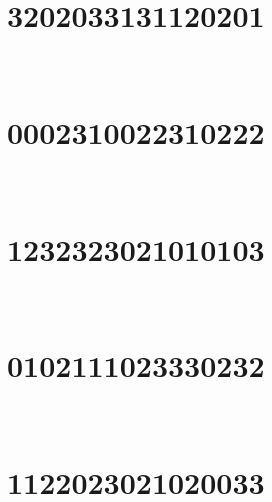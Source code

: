 \section{3202033131120201}

\marginnote[3\baselineskip]{\centering}



\,
\newline
\vspace{1.2cm}

\section{0002310022310222}

\marginnote[3\baselineskip]{\centering}



\,
\newline
\vspace{1.2cm}

\section{1232323021010103}

\marginnote[3\baselineskip]{\centering}



\,
\newline
\vspace{1.2cm}

\section{0102111023330232}

\marginnote[3\baselineskip]{\centering}



\,
\newline
\vspace{1.2cm}

\section{1122023021020033}

